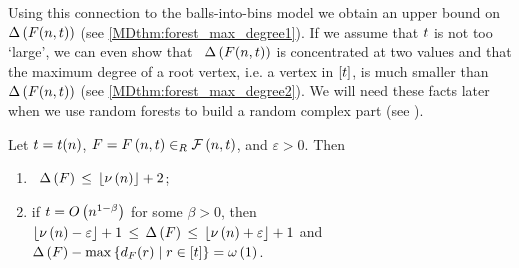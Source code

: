 Using this connection to the balls-into-bins model we obtain an upper bound on $\Delta\left(F(n,t)\right)$ (see \ref{MDthm:forest_max_degree1}). If we assume that $t$ is not too \lq large\rq, we can even show that \whp\ $\Delta\left(F(n,t)\right)$ is concentrated at two values and that the maximum degree of a root vertex, i.e. a vertex in $[t]$, is much smaller than $\Delta\left(F(n,t)\right)$ (see \ref{MDthm:forest_max_degree2}). We will need these facts later when we use random forests to build a random complex part (see ).
\begin{thm}\label{MDthm:forest_max_degree}
Let $t=t(n)$, $F=F\left(n, t\right)\in_R \mathcal{F}\left(n, t\right)$, and $\varepsilon>0$. Then 
\begin{enumerate}
\item\label{MDthm:forest_max_degree1}
\whp\
$\Delta\left(F\right)\hspace{0.06cm}\leq\hspace{0.06cm} \left\lfloor\nu\left(n\right)\right\rfloor+2$;
\item\label{MDthm:forest_max_degree2}
if $t=O\left(n^{1-\beta}\right)$ for some $\beta>0$, then \whp\ $\left\lfloor\nu\left(n\right)-\varepsilon\right\rfloor+1\hspace{0.06cm}\leq\hspace{0.06cm} \Delta\left(F\right)\hspace{0.06cm}\leq\hspace{0.06cm} \left\lfloor\nu\left(n\right)+\varepsilon\right\rfloor+1$ and $\Delta\left(F\right)-\max\left\{d_F(r) \mid r \in [t]\right\}=\omega\left(1\right)$.
\end{enumerate}
\end{thm}

